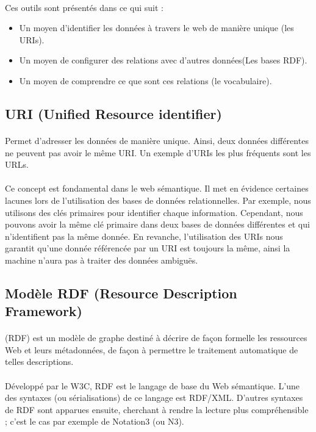 \documentclass[12pt, a4paper, oneside]{book}
\begin{document}
\paragraph{}
Ces outils sont présentés dans ce qui suit :
\begin{itemize}
\item Un moyen d'identifier les données à travers le web de manière unique (les URIs).
\item Un moyen de configurer des relations avec d'autres données(Les bases RDF).
\item Un moyen de comprendre ce que sont ces relations (le vocabulaire).
\end{itemize}

\subsection{URI (Unified Resource identifier)}
\paragraph{}
Permet d'adresser les données de manière unique. 
Ainsi, deux données différentes ne peuvent pas avoir le même URI.
Un exemple d'URIs les plus fréquents sont les URLs.
\paragraph{}
Ce concept est fondamental dans le web sémantique.
Il met en évidence certaines lacunes lors de l'utilisation des bases de données relationnelles.
Par exemple, nous utilisons des clés primaires pour identifier chaque information. Cependant, nous pouvons avoir la même clé primaire dans deux bases de données différentes et qui n'identifient pas la même donnée. 
En revanche, l'utilisation des URIs nous garantit qu'une donnée référencée par un URI est toujours la même, ainsi la machine n'aura pas à traiter des données ambiguës.

\subsection{Modèle RDF (Resource Description Framework)}
\paragraph{}
(RDF) est un modèle de graphe destiné à décrire de façon formelle les ressources Web et leurs métadonnées, de façon à permettre le traitement automatique de telles descriptions. 
\paragraph{}
Développé par le W3C, RDF est le langage de base du Web sémantique. L'une des syntaxes (ou sérialisations) de ce langage est RDF/XML. D'autres syntaxes de RDF sont apparues ensuite, cherchant à rendre la lecture plus compréhensible ; c'est le cas par exemple de Notation3 (ou N3).
\end{document}

